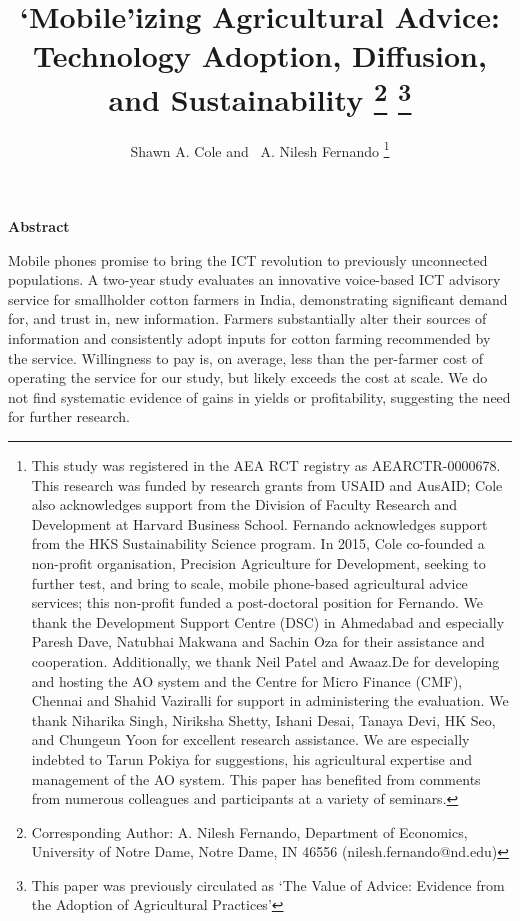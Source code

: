 \documentclass[12pt]{article}
\begin{document}
\title{`Mobile’izing Agricultural Advice: Technology Adoption, Diffusion, and Sustainability \thanks{Corresponding Author: A. Nilesh Fernando, Department of  Economics, University of Notre Dame, Notre Dame, IN 46556 (nilesh.fernando@nd.edu)} \thanks{%
This paper was previously circulated as `The Value of Advice: Evidence from
the Adoption of Agricultural Practices'}}
\author{Shawn A. Cole and \ A. Nilesh Fernando \thanks{This study was registered in the AEA RCT registry
as AEARCTR-0000678. This research was funded by research grants from USAID
and AusAID; Cole also acknowledges support from the Division of Faculty
Research and Development at Harvard Business School. Fernando acknowledges
support from the HKS Sustainability Science program. In 2015, Cole
co-founded a non-profit organisation, Precision Agriculture for Development, seeking to further test, and bring to
scale, mobile phone-based agricultural advice services; this non-profit
funded a post-doctoral position for Fernando. We thank the Development
Support Centre (DSC) in Ahmedabad and especially Paresh Dave, Natubhai
Makwana and Sachin Oza for their assistance and cooperation. Additionally,
we thank Neil Patel and Awaaz.De for developing and hosting the AO system and the Centre
for Micro Finance (CMF), Chennai and Shahid Vaziralli for support in
administering the evaluation. We thank Niharika Singh, Niriksha Shetty,
Ishani Desai, Tanaya Devi, HK Seo, and Chungeun Yoon for excellent research assistance. We
are especially indebted to Tarun Pokiya for suggestions, his agricultural
expertise and management of the AO system. This paper has benefited from
comments from numerous colleagues and participants at a variety of seminars.}}
\maketitle

\thispagestyle{empty}

\onehalfspacing

\begin{center}
\textbf{Abstract}
\end{center}


{\footnotesize Mobile phones promise to bring the ICT revolution to
previously unconnected populations. A two-year study evaluates an
innovative voice-based ICT advisory service for smallholder cotton farmers
in India, demonstrating significant demand for, and trust in, new
information. Farmers substantially alter their sources of
information and consistently adopt inputs for cotton farming recommended by the service. Willingness to pay is, on average, less than the per-farmer cost of operating the service for our study, but likely exceeds the cost at scale. We do not find systematic evidence of gains in yields or profitability, suggesting the need for further research.}
\end{document}
